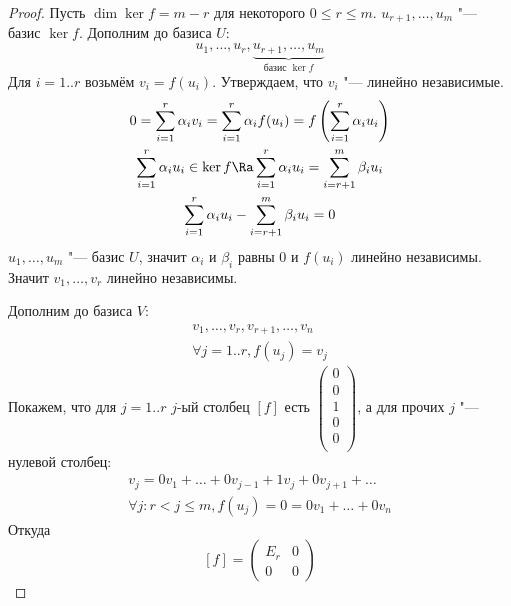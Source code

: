 \begin{proof}
	Пусть $\dim \ker f = m - r$ для некоторого $0 \le r \le m$.
	$u_{r+1}, \dots, u_m$ "--- базис $\ker f$.
	Дополним до базиса $U$:
	\[ u_1, \dots, u_r, \underbrace{u_{r+1}, \dots, u_m}_{\text{базис $\ker f$}} \]
	Для $i = 1..r$ возьмём $v_i = f(u_i)$.
	Утверждаем, что $v_i$ "--- линейно независимые.
	\begin{gather*}
		0 = \sum_{i=1}^r \alpha_iv_i = \sum_{i=1}^r \alpha_if(u_i)= f\left(\sum_{i=1}^r \alpha_iu_i\right) \\
		\sum_{i=1}^r \alpha_iu_i \in \ker f \Ra \sum_{i=1}^r \alpha_iu_i = \sum_{i=r+1}^m \beta_i u_i \\
		\sum_{i=1}^r \alpha_iu_i - \sum_{i=r+1}^m \beta_iu_i = 0
	\end{gather*}
	$u_1, \dots, u_m$ "--- базис $U$, значит $\alpha_i$ и $\beta_i$ равны $0$ и $f(u_i)$ линейно независимы.
	Значит $v_1, \dots, v_r$ линейно независимы.

	Дополним до базиса $V$:
	\begin{gather*}
		v_1, \dots, v_r, v_{r+1}, \dots, v_n \\
		\forall j=1..r, f(u_j) = v_j
	\end{gather*}
	Покажем, что для $j=1..r$ $j$-ый столбец $[f]$ есть $\begin{pmatrix} 0 \\0 \\1 \\0 \\0 \\ \end{pmatrix}$,
	а для прочих $j$ "--- нулевой столбец:
	\begin{gather*}
		v_j = 0v_1 + \dots + 0v_{j-1} + 1v_j + 0v_{j+1} + \dots \\
		\forall j\colon r < j \le m, f(u_j) = 0 = 0 v_1 + \dots + 0v_n
	\end{gather*}
	Откуда
	\[
		[f] = \begin{pmatrix}
			E_r & 0 \\
			0   & 0
		\end{pmatrix}
	\]
\end{proof}

